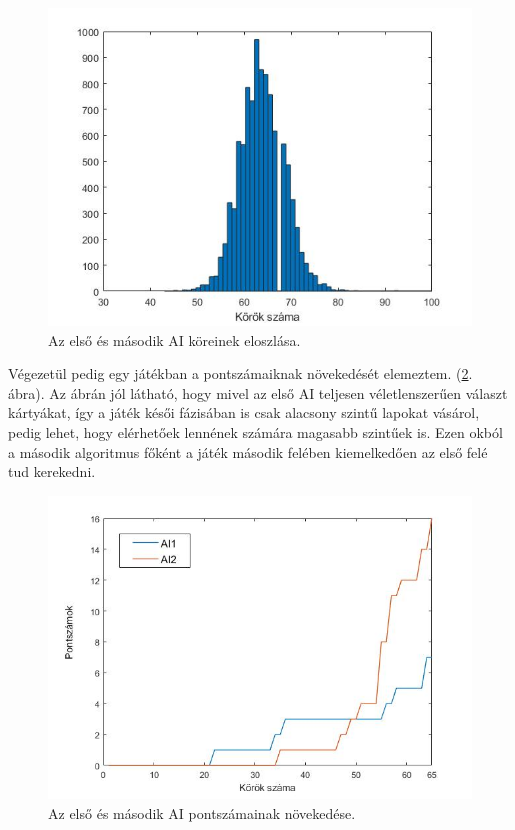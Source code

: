 \begin{figure}[h]
\centering
\includegraphics[scale=0.7]{images/round_number_hist_AI1vsAI2.jpg}
\caption{Az első és második AI köreinek eloszlása.}
\label{fig:rounds1v2}
\end{figure}

Végezetül pedig egy játékban a pontszámaiknak növekedését elemeztem. (\ref{fig:player_scores1v2}. ábra). Az ábrán jól látható, hogy mivel az első AI teljesen véletlenszerűen választ kártyákat, így a játék késői fázisában is csak alacsony szintű lapokat vásárol, pedig lehet, hogy elérhetőek lennének számára magasabb szintűek is. Ezen okból a második algoritmus főként a játék második felében kiemelkedően az első felé tud kerekedni.

\begin{figure}[h]
\centering
\includegraphics[scale=0.6]{images/player_points_AI1vsAI2.jpg}
\caption{Az első és második AI pontszámainak növekedése.}
\label{fig:player_scores1v2}
\end{figure}

